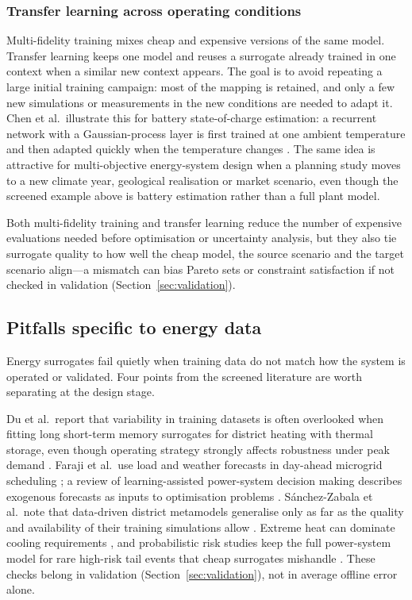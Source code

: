 \subsubsection{Transfer learning across operating conditions}
\label{sec:doe:transfer}

Multi-fidelity training mixes cheap and expensive versions of the
same model. Transfer learning keeps one model and reuses a surrogate
already trained in one context when a similar new context appears. The goal is to avoid repeating a large initial training
campaign: most of the mapping is retained, and only a few new
simulations or measurements in the new conditions are needed to adapt
it. Chen et al.\ illustrate this for battery state-of-charge estimation:
a recurrent network with a Gaussian-process layer is first trained at
one ambient temperature and then adapted quickly when the temperature
changes \cite{Chen202514792}. The same idea is attractive for
multi-objective energy-system design when a planning study moves to a
new climate year, geological realisation or market scenario, even
though the screened example above is battery estimation rather than a
full plant model.

Both multi-fidelity training and transfer learning reduce the number of
expensive evaluations needed before optimisation or uncertainty
analysis, but they also tie surrogate quality to how well the cheap
model, the source scenario and the target scenario align---a mismatch
can bias Pareto sets or constraint satisfaction if not checked in
validation (Section~\ref{sec:validation}).

\subsection{Pitfalls specific to energy data}
\label{sec:doe:pitfalls}

Energy surrogates fail quietly when training data do not match how the
system is operated or validated. Four points from the screened
literature are worth separating at the design stage.

Du et al.\ report that variability in training datasets is often
overlooked when fitting long short-term memory surrogates for district
heating with thermal storage, even though operating strategy strongly
affects robustness under peak demand \cite{Du2025}. Faraji et al.\ use
load and weather forecasts in day-ahead microgrid scheduling
\cite{Faraji2020157284}; a review of learning-assisted power-system
decision making describes exogenous forecasts as inputs to optimisation
problems \cite{Lim2025}.
Sánchez-Zabala et al.\ note that data-driven district metamodels
generalise only as far as the quality and availability of their training
simulations allow \cite{Sánchez-Zabala2024}. Extreme heat can dominate
cooling requirements \cite{Morakinyo201973}, and probabilistic risk
studies keep the full power-system model for rare high-risk tail events
that cheap surrogates mishandle \cite{Xu20203127}. These checks belong in
validation (Section~\ref{sec:validation}), not in average offline error
alone.
